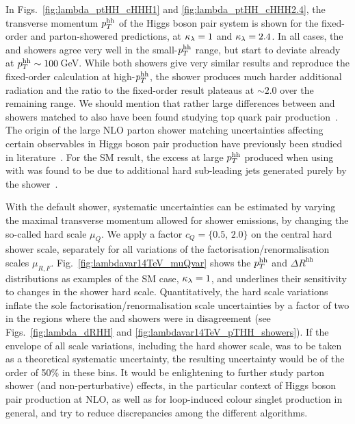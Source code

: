 In Figs.~\ref{fig:lambda_ptHH_cHHH1} and \ref{fig:lambda_ptHH_cHHH2.4}, the transverse 
momentum $p_T^{\mathrm{hh}}$ of the Higgs boson pair system is shown for the fixed-order and parton-showered predictions, at $\kappa_{\lambda}=1$ and $\kappa_{\lambda}=2.4$. In all cases, the \pyth and \herw showers 
agree very well in the small-$p_T^{\mathrm{hh}}$ range, but start to deviate already at $p_T^{\mathrm{hh}} \sim 100$\,GeV. 
While both \herw showers give very similar results and reproduce the fixed-order calculation at high-$p_T^{\mathrm{hh}}$, the 
\pyth shower produces much harder additional radiation and the ratio to the fixed-order result plateaus at $\sim 2.0$ over the remaining range. 
We should mention that rather large differences between \pythia and
\herwig showers matched to \powheg{} also have been found studying top
quark pair production~\cite{Ravasio:2018lzi}. The origin of the large NLO parton shower matching uncertainties affecting certain observables in Higgs boson pair production have previously been studied in literature~\cite{Jones:2017giv}. For the SM result, the excess at large $p_T^{\mathrm{hh}}$ produced when using \powheg{} with \pythia was found to be due to additional hard sub-leading jets generated purely by the shower~\cite{Bendavid:2018nar}.

With the \herw default shower, systematic uncertainties can be estimated by 
varying the maximal transverse momentum allowed for shower emissions,
by changing the so-called hard scale $\mu_Q$. We apply a factor $c_Q=\{0.5,\,2.0\}$ on the central hard shower scale, separately 
for all variations of the factorisation/renormalisation scales
$\mu_{R,F}$.
Fig.~\ref{fig:lambdavar14TeV_muQvar} shows the $p_T^{\mathrm{hh}}$ and 
$\Delta R^{\mathrm{hh}}$ distributions as examples of the SM case, $\kappa_{\lambda}=1$, and underlines 
their sensitivity to changes in the shower hard scale. Quantitatively, the hard scale variations 
inflate the sole factorisation/renormalisation scale uncertainties by a factor of two in 
the regions where the \herwig and \pythia showers were in disagreement (see Figs.~\ref{fig:lambda_dRHH} 
and \ref{fig:lambdavar14TeV_pTHH_showers}). If the envelope of all scale variations, including 
the hard shower scale, was to be taken as a theoretical systematic uncertainty, the resulting 
uncertainty would be of the order of 50\% in these bins. It would be enlightening to further study 
parton shower (and non-perturbative) effects, in the particular context of Higgs boson pair 
production at NLO, as well as for loop-induced colour singlet production in general, and try to reduce discrepancies among the different algorithms. 


